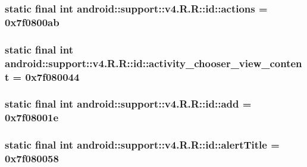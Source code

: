\hypertarget{classandroid_1_1support_1_1v4_1_1_r_1_1id_a294821655293ae35b50071cbdd55758}{
\subsubsection[{actions}]{\setlength{\rightskip}{0pt plus 5cm}static final int android::support::v4.R.R::id::actions = 0x7f0800ab}}
\label{classandroid_1_1support_1_1v4_1_1_r_1_1id_a294821655293ae35b50071cbdd55758}


\hypertarget{classandroid_1_1support_1_1v4_1_1_r_1_1id_c06fc34c54206f7cac7c625a2f80e29a}{
\subsubsection[{activity\_\-chooser\_\-view\_\-content}]{\setlength{\rightskip}{0pt plus 5cm}static final int android::support::v4.R.R::id::activity\_\-chooser\_\-view\_\-content = 0x7f080044}}
\label{classandroid_1_1support_1_1v4_1_1_r_1_1id_c06fc34c54206f7cac7c625a2f80e29a}


\hypertarget{classandroid_1_1support_1_1v4_1_1_r_1_1id_851cf32fc3bf6fb48832c4042f8121b3}{
\subsubsection[{add}]{\setlength{\rightskip}{0pt plus 5cm}static final int android::support::v4.R.R::id::add = 0x7f08001e}}
\label{classandroid_1_1support_1_1v4_1_1_r_1_1id_851cf32fc3bf6fb48832c4042f8121b3}


\hypertarget{classandroid_1_1support_1_1v4_1_1_r_1_1id_9e49ca03230a91da0cb9e18c8cc095a1}{
\subsubsection[{alertTitle}]{\setlength{\rightskip}{0pt plus 5cm}static final int android::support::v4.R.R::id::alertTitle = 0x7f080058}}
\label{classandroid_1_1support_1_1v4_1_1_r_1_1id_9e49ca03230a91da0cb9e18c8cc095a1}


